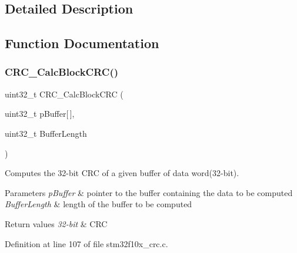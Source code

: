 \subsection{Detailed Description}


\subsection{Function Documentation}
\mbox{\label{group___c_r_c___exported___functions_gab15ebf620615c360048fb4f45b15fae6}} 
\subsubsection{\texorpdfstring{C\+R\+C\+\_\+\+Calc\+Block\+C\+R\+C()}{CRC\_CalcBlockCRC()}}
{\footnotesize\ttfamily uint32\+\_\+t C\+R\+C\+\_\+\+Calc\+Block\+C\+RC (\begin{DoxyParamCaption}\item[{uint32\+\_\+t}]{p\+Buffer\mbox{[}$\,$\mbox{]},  }\item[{uint32\+\_\+t}]{Buffer\+Length }\end{DoxyParamCaption})}



Computes the 32-\/bit C\+RC of a given buffer of data word(32-\/bit). 


\begin{DoxyParams}{Parameters}
{\em p\+Buffer} & pointer to the buffer containing the data to be computed \\
\hline
{\em Buffer\+Length} & length of the buffer to be computed \\
\hline
\end{DoxyParams}

\begin{DoxyRetVals}{Return values}
{\em 32-\/bit} & C\+RC \\
\hline
\end{DoxyRetVals}


Definition at line 107 of file stm32f10x\+\_\+crc.\+c.

\mbox{\label{group___c_r_c___exported___functions_ga5407fdbb8e8c9be6322cc8856ae5db3b}} 
